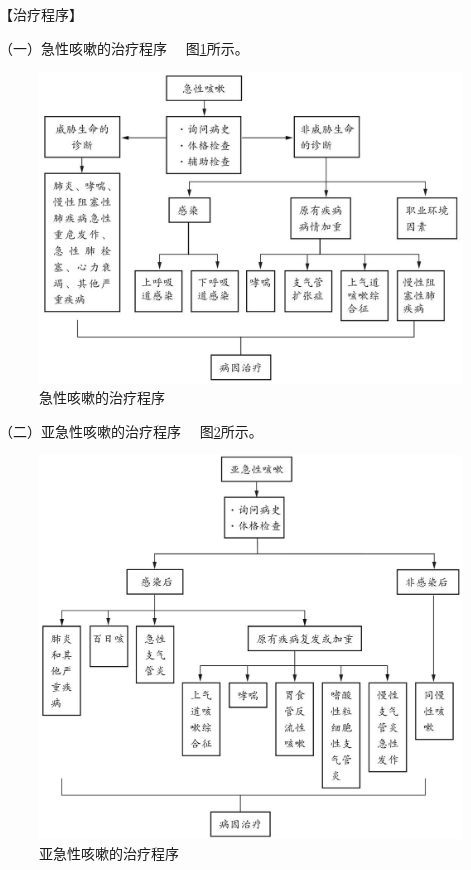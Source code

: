 【治疗程序】

{（一）急性咳嗽的治疗程序} 　图\ref{fig1-7-1}所示。

\begin{figure}[!htbp]
 \centering
 \includegraphics{./images/Image00012.jpg}
 \captionsetup{justification=centering}
 \caption{急性咳嗽的治疗程序}
 \label{fig1-7-1}
  \end{figure} 

{（二）亚急性咳嗽的治疗程序} 　图\ref{fig1-7-2}所示。

\begin{figure}[!htbp]
 \centering
 \includegraphics{./images/Image00013.jpg}
 \captionsetup{justification=centering}
 \caption{亚急性咳嗽的治疗程序}
 \label{fig1-7-2}
  \end{figure} 

